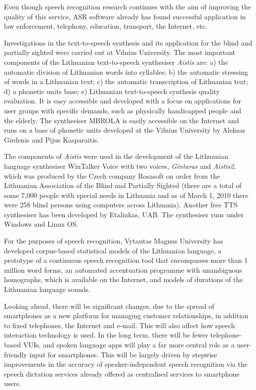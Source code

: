 \begin{multicols}{2}
    Even though speech recognition research continues with the aim of improving the quality of this service, ASR software already has found successful application in law enforcement, telephony, education, transport, the Internet, etc.

Investigations in the text-to-speech synthesis and its application for the blind and partially sighted were carried out at Vilnius University. The most important components of the Lithuanian text-to-speech synthesiser \textit{Aistis} are: a) the automatic division of Lithuanian words into syllables; b) the automatic stressing of words in a Lithuanian text; c) the automatic transcription of Lithuanian text; d) a phonetic units base; e) Lithuanian text-to-speech synthesis quality evaluation. It is easy accessible and developed with a focus on applications for user groups with specific demands, such as physically handicapped people and the elderly. The synthesiser MBROLA is easily accessible on the Internet and runs on a base of phonetic units developed at the Vilnius University by Aleksas Girdenis and Pijus Kasparaitis.

The components of \textit{Aistis} were used in the development of the Lithuanian language synthesiser WinTalker Voice with two voices,  \textit{Gintaras} and  \textit{Aistis2}, which was produced by the Czech company Rosasoft on order from the Lithuanian Association of the Blind and Partially Sighted (there are a total of some 7,000 people with special needs in Lithuania and as of March 1, 2010 there were 258 blind persons using computers across Lithuania). Another free TTS synthesiser has been developed by  Etalinkas, UAB. The synthesiser runs under Windows and Linux OS.

For the purposes of speech recognition, Vytautas Magnus University has developed corpus-based statistical models of the Lithuanian language, a prototype of a continuous speech recognition tool that encompasses more than 1 million word forms, an automated accentuation programme with unambiguous homographs, which is available on the Internet, and models of durations of the Lithuanian language sounds.

Looking ahead, there will be significant changes, due to the spread of smartphones as a new platform for managing customer relationships, in addition to fixed telephones, the Internet and e-mail. This will also affect how speech interaction technology is used. In the long term, there will be fewer telephone-based VUIs, and spoken language apps will play a far more central role as a user-friendly input for smartphones. This will be largely driven by stepwise improvements in the accuracy of speaker-independent speech recognition via the speech dictation services already offered as centralised services to smartphone users.


\end{multicols}
